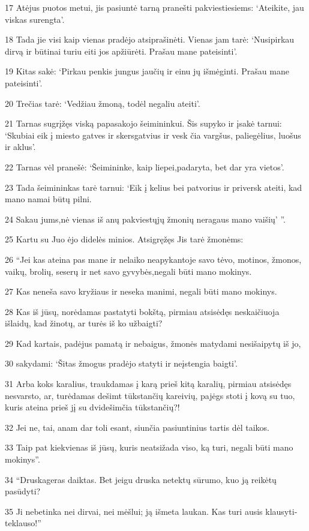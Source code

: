 \par 17 Atėjus puotos metui, jis pasiuntė tarną pranešti pakviestiesiems: ‘Ateikite, jau viskas surengta’. 
\par 18 Tada jie visi kaip vienas pradėjo atsiprašinėti. Vienas jam tarė: ‘Nusipirkau dirvą ir būtinai turiu eiti jos apžiūrėti. Prašau mane pateisinti’. 
\par 19 Kitas sakė: ‘Pirkau penkis jungus jaučių ir einu jų išmėginti. Prašau mane pateisinti’. 
\par 20 Trečias tarė: ‘Vedžiau žmoną, todėl negaliu ateiti’. 
\par 21 Tarnas sugrįžęs viską papasakojo šeimininkui. Šis supyko ir įsakė tarnui: ‘Skubiai eik į miesto gatves ir skersgatvius ir vesk čia vargšus, paliegėlius, luošus ir aklus’. 
\par 22 Tarnas vėl pranešė: ‘Šeimininke, kaip liepei,­padaryta, bet dar yra vietos’. 
\par 23 Tada šeimininkas tarė tarnui: ‘Eik į kelius bei patvorius ir priversk ateiti, kad mano namai būtų pilni. 
\par 24 Sakau jums,­nė vienas iš anų pakviestųjų žmonių neragaus mano vaišių’ ”. 
\par 25 Kartu su Juo ėjo didelės minios. Atsigręžęs Jis tarė žmonėms: 
\par 26 “Jei kas ateina pas mane ir nelaiko neapykantoje savo tėvo, motinos, žmonos, vaikų, brolių, seserų ir net savo gyvybės,­negali būti mano mokinys. 
\par 27 Kas neneša savo kryžiaus ir neseka manimi, negali būti mano mokinys. 
\par 28 Kas iš jūsų, norėdamas pastatyti bokštą, pirmiau atsisėdęs neskaičiuoja išlaidų, kad žinotų, ar turės iš ko užbaigti? 
\par 29 Kad kartais, padėjus pamatą ir nebaigus, žmonės matydami nesišaipytų iš jo, 
\par 30 sakydami: ‘Šitas žmogus pradėjo statyti ir neįstengia baigti’. 
\par 31 Arba koks karalius, traukdamas į karą prieš kitą karalių, pirmiau atsisėdęs nesvarsto, ar, turėdamas dešimt tūkstančių kareivių, pajėgs stoti į kovą su tuo, kuris ateina prieš jį su dvidešimčia tūkstančių?! 
\par 32 Jei ne, tai, anam dar toli esant, siunčia pasiuntinius tartis dėl taikos. 
\par 33 Taip pat kiekvienas iš jūsų, kuris neatsižada viso, ką turi, negali būti mano mokinys”. 
\par 34 “Druska­geras daiktas. Bet jeigu druska netektų sūrumo, kuo ją reikėtų pasūdyti? 
\par 35 Ji nebetinka nei dirvai, nei mėšlui; ją išmeta laukan. Kas turi ausis klausyti­teklauso!”



